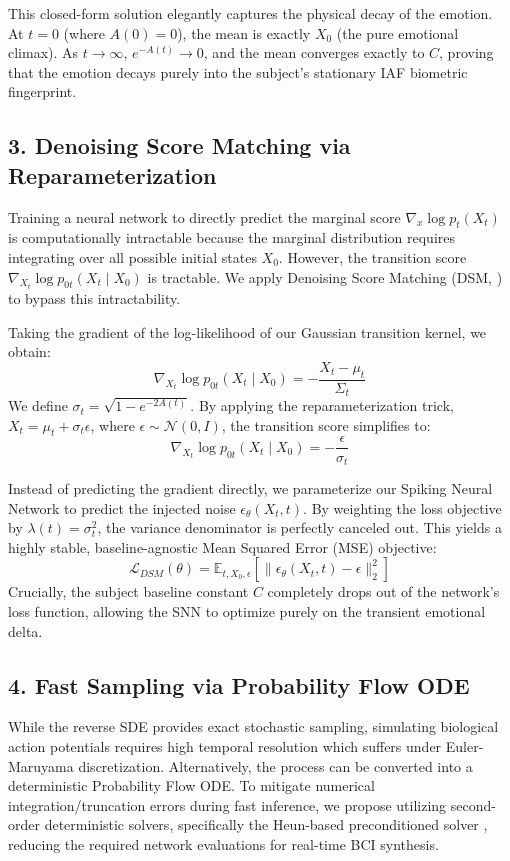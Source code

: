 \documentclass[conference]{IEEEtran}
\begin{document}
This closed-form solution elegantly captures the physical decay of the emotion. At $t=0$ (where $A(0)=0$), the mean is exactly $X_0$ (the pure emotional climax). As $t \to \infty$, $e^{-A(t)} \to 0$, and the mean converges exactly to $C$, proving that the emotion decays purely into the subject's stationary IAF biometric fingerprint.

\subsection*{3. Denoising Score Matching via Reparameterization}
Training a neural network to directly predict the marginal score $\nabla_{x} \log p_t(X_t)$ is computationally intractable because the marginal distribution requires integrating over all possible initial states $X_0$. However, the transition score $\nabla_{X_t} \log p_{0t}(X_t \mid X_0)$ is tractable. We apply Denoising Score Matching (DSM, \cite{Song2019}) to bypass this intractability. 

Taking the gradient of the log-likelihood of our Gaussian transition kernel, we obtain:
\begin{equation}
    \nabla_{X_t} \log p_{0t}(X_t \mid X_0) = -\frac{X_t - \mu_t}{\Sigma_t}
\end{equation}
We define $\sigma_t = \sqrt{1 - e^{-2A(t)}}$. By applying the reparameterization trick, $X_t = \mu_t + \sigma_t \epsilon$, where $\epsilon \sim \mathcal{N}(0, I)$, the transition score simplifies to:
\begin{equation}
    \nabla_{X_t} \log p_{0t}(X_t \mid X_0) = -\frac{\epsilon}{\sigma_t}
\end{equation}

Instead of predicting the gradient directly, we parameterize our Spiking Neural Network to predict the injected noise $\epsilon_\theta(X_t, t)$. By weighting the loss objective by $\lambda(t) = \sigma_t^2$, the variance denominator is perfectly canceled out. This yields a highly stable, baseline-agnostic Mean Squared Error (MSE) objective:
\begin{equation}
    \mathcal{L}_{DSM}(\theta) = \mathbb{E}_{t, X_0, \epsilon} \left[ \| \epsilon_\theta(X_t, t) - \epsilon \|_2^2 \right]
\end{equation}
Crucially, the subject baseline constant $C$ completely drops out of the network's loss function, allowing the SNN to optimize purely on the transient emotional delta.

\subsection*{4. Fast Sampling via Probability Flow ODE}
While the reverse SDE provides exact stochastic sampling, simulating biological action potentials requires high temporal resolution which suffers under Euler-Maruyama discretization. Alternatively, the process can be converted into a deterministic Probability Flow ODE. To mitigate numerical integration/truncation errors during fast inference, we propose utilizing second-order deterministic solvers, specifically the Heun-based preconditioned solver \cite{Karras2022}, reducing the required network evaluations for real-time BCI synthesis.



\end{document}
